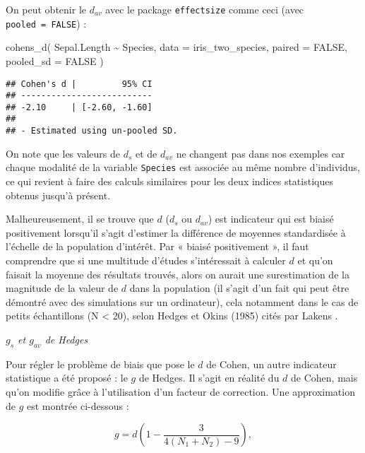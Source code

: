 \documentclass[
]{book}
\newenvironment{Shaded}{\begin{snugshade}}{\end{snugshade}}
\newcommand{\AttributeTok}[1]{\textcolor[rgb]{0.77,0.63,0.00}{#1}}
\newcommand{\ConstantTok}[1]{\textcolor[rgb]{0.00,0.00,0.00}{#1}}
\newcommand{\FunctionTok}[1]{\textcolor[rgb]{0.00,0.00,0.00}{#1}}
\newcommand{\NormalTok}[1]{#1}
\newcommand{\SpecialCharTok}[1]{\textcolor[rgb]{0.00,0.00,0.00}{#1}}
\begin{document}
On peut obtenir le \(d_{av}\) avec le package \texttt{effectsize} comme ceci (avec \texttt{pooled\ =\ FALSE}) :

\begin{Shaded}
\begin{Highlighting}[]
\FunctionTok{cohens\_d}\NormalTok{(}
\NormalTok{  Sepal.Length }\SpecialCharTok{\textasciitilde{}}\NormalTok{ Species, }
  \AttributeTok{data =}\NormalTok{ iris\_two\_species, }
  \AttributeTok{paired =} \ConstantTok{FALSE}\NormalTok{, }
  \AttributeTok{pooled\_sd =} \ConstantTok{FALSE}
\NormalTok{  )}
\end{Highlighting}
\end{Shaded}

\begin{verbatim}
## Cohen's d |         95% CI
## --------------------------
## -2.10     | [-2.60, -1.60]
## 
## - Estimated using un-pooled SD.
\end{verbatim}

On note que les valeurs de \(d_s\) et de \(d_{av}\) ne changent pas dans nos exemples car chaque modalité de la variable \texttt{Species} est associée au même nombre d'individus, ce qui revient à faire des calculs similaires pour les deux indices statistiques obtenus jusqu'à présent.

Malheureusement, il se trouve que \(d\) (\(d_s\) ou \(d_{av}\)) est indicateur qui est biaisé positivement lorsqu'il s'agit d'estimer la différence de moyennes standardisée à l'échelle de la population d'intérêt. Par « biaisé positivement », il faut comprendre que si une multitude d'études s'intéressait à calculer \(d\) et qu'on faisait la moyenne des résultats trouvés, alors on aurait une surestimation de la magnitude de la valeur de \(d\) dans la population (il s'agit d'un fait qui peut être démontré avec des simulations sur un ordinateur), cela notamment dans le cas de petits échantillons (N \textless{} 20), selon Hedges et Okins (1985) cités par Lakens \autocite*{lakensCalculatingReportingEffect2013}.

\emph{\(g_{s}\) et \(g_{av}\) de Hedges}

Pour régler le problème de biais que pose le \(d\) de Cohen, un autre indicateur statistique a été proposé : le \(g\) de Hedges. Il s'agit en réalité du \(d\) de Cohen, mais qu'on modifie grâce à l'utilisation d'un facteur de correction. Une approximation de \(g\) est montrée ci-dessous \autocite*{lakensCalculatingReportingEffect2013} :

\[g = d (1 - \frac{3}{4(N_{1} + N_{2}) - 9}),\]
\end{document}
